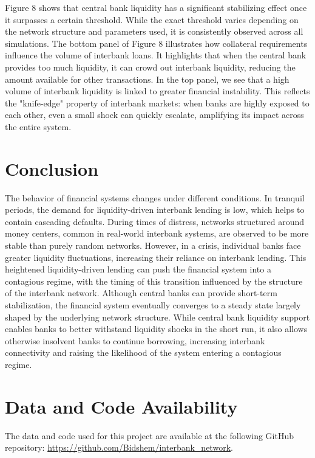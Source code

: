 \documentclass{article} %
\begin{document}
Figure 8 shows that central bank liquidity has a significant stabilizing effect once it surpasses a certain threshold. While the exact threshold varies depending on the network structure and parameters used, it is consistently observed across all simulations. The bottom panel of Figure 8 illustrates how collateral requirements influence the volume of interbank loans. It highlights that when the central bank provides too much liquidity, it can crowd out interbank liquidity, reducing the amount available for other transactions. In the top panel, we see that a high volume of interbank liquidity is linked to greater financial instability. This reflects the "knife-edge" property of interbank markets: when banks are highly exposed to each other, even a small shock can quickly escalate, amplifying its impact across the entire system.



\section{Conclusion}

The behavior of financial systems changes under different conditions. In tranquil periods, the demand for liquidity-driven interbank lending is low, which helps to contain cascading defaults. During times of distress, networks structured around money centers, common in real-world interbank systems, are observed to be more stable than purely random networks. However, in a crisis, individual banks face greater liquidity fluctuations, increasing their reliance on interbank lending. This heightened liquidity-driven lending can push the financial system into a contagious regime, with the timing of this transition influenced by the structure of the interbank network. Although central banks can provide short-term stabilization, the financial system eventually converges to a steady state largely shaped by the underlying network structure. While central bank liquidity support enables banks to better withstand liquidity shocks in the short run, it also allows otherwise insolvent banks to continue borrowing, increasing interbank connectivity and raising the likelihood of the system entering a contagious regime.

\section{Data and Code Availability}

The data and code used for this project are available at the following GitHub repository: \href{https://github.com/Bidshem/interbank_network}{https://github.com/Bidshem/interbank\_network}.




\end{document}
